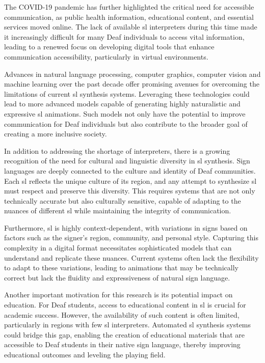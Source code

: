 \documentclass[../../main.tex]{subfiles}
\begin{document}
The COVID-19 pandemic has further highlighted the critical need for accessible communication, as public health information, educational content, and essential services moved online. The lack of available \gls{sl} interpreters during this time made it increasingly difficult for many Deaf individuals to access vital information, leading to a renewed focus on developing digital tools that enhance communication accessibility, particularly in virtual environments.

Advances in natural language processing, computer graphics, computer vision and machine learning  over the past decade offer promising avenues for overcoming the limitations of current \gls{sl} synthesis systems. Leveraging these technologies could lead to more advanced models capable of generating highly naturalistic and expressive \gls{sl} animations. Such models not only have the potential to improve communication for Deaf individuals but also contribute to the broader goal of creating a more inclusive society.

In addition to addressing the shortage of interpreters, there is a growing recognition of the need for cultural and linguistic diversity in \gls{sl} synthesis. Sign languages are deeply connected to the culture and identity of Deaf communities. Each \gls{sl} reflects the unique culture of its region, and any attempt to synthesize \gls{sl} must respect and preserve this diversity. This requires systems that are not only technically accurate but also culturally sensitive, capable of adapting to the nuances of different \gls{sl} while maintaining the integrity of communication.

Furthermore, \gls{sl} is highly context-dependent, with variations in signs based on factors such as the signer’s region, community, and personal style. Capturing this complexity in a digital format necessitates sophisticated models that can understand and replicate these nuances. Current systems often lack the flexibility to adapt to these variations, leading to animations that may be technically correct but lack the fluidity and expressiveness of natural sign language.

Another important motivation for this research is its potential impact on education. For Deaf students, access to educational content in \gls{sl} is crucial for academic success. However, the availability of such content is often limited, particularly in regions with few \gls{sl} interpreters. Automated \gls{sl} synthesis systems could bridge this gap, enabling the creation of educational materials that are accessible to Deaf students in their native sign language, thereby improving educational outcomes and leveling the playing field.
\end{document}
